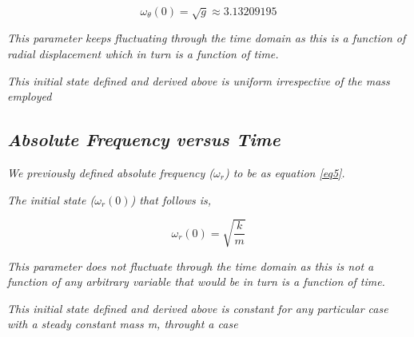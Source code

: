                 $$\omega_\theta(0) = \sqrt{g} \approx 3.13209195$$
                
                \textit{This parameter keeps fluctuating through the time domain as this is a function of radial displacement which in turn is a function of time.}
                
                \textit{This initial state defined and derived above is uniform irrespective of the mass employed}
                
    
    \subsection{\textit{Absolute Frequency versus Time}}
                
                \textit{We previously defined absolute frequency ($\omega_r$) to be as equation \ref{eq5}.}
                
                \textit{The initial state ($\omega_r(0)$) that follows is,}
                
                $$\omega_r(0) = \sqrt{\frac{k}{m}}$$
                
                \textit{This parameter does not fluctuate through the time domain as this is not a function of any arbitrary variable that would be in turn is a function of time.}
                
                \textit{This initial state defined and derived above is constant for any particular case with a steady constant mass m, throught a case}
            
            


